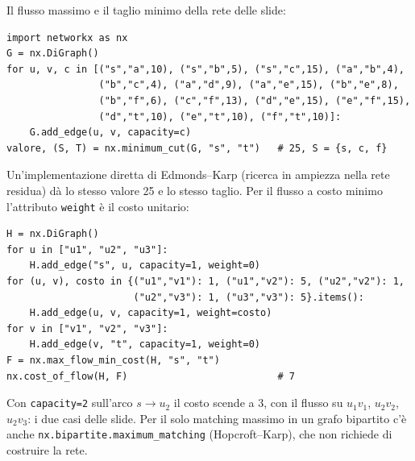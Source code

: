 Il flusso massimo e il taglio minimo della rete delle slide:
\begin{lstlisting}
import networkx as nx
G = nx.DiGraph()
for u, v, c in [("s","a",10), ("s","b",5), ("s","c",15), ("a","b",4),
                ("b","c",4), ("a","d",9), ("a","e",15), ("b","e",8),
                ("b","f",6), ("c","f",13), ("d","e",15), ("e","f",15),
                ("d","t",10), ("e","t",10), ("f","t",10)]:
    G.add_edge(u, v, capacity=c)
valore, (S, T) = nx.minimum_cut(G, "s", "t")   # 25, S = {s, c, f}
\end{lstlisting}
Un'implementazione diretta di Edmonds--Karp (ricerca in ampiezza nella rete residua) dà lo
stesso valore 25 e lo stesso taglio. Per il flusso a costo minimo l'attributo
\texttt{weight} è il costo unitario:
\begin{lstlisting}
H = nx.DiGraph()
for u in ["u1", "u2", "u3"]:
    H.add_edge("s", u, capacity=1, weight=0)
for (u, v), costo in {("u1","v1"): 1, ("u1","v2"): 5, ("u2","v2"): 1,
                      ("u2","v3"): 1, ("u3","v3"): 5}.items():
    H.add_edge(u, v, capacity=1, weight=costo)
for v in ["v1", "v2", "v3"]:
    H.add_edge(v, "t", capacity=1, weight=0)
F = nx.max_flow_min_cost(H, "s", "t")
nx.cost_of_flow(H, F)                          # 7
\end{lstlisting}
Con \texttt{capacity=2} sull'arco $s \to u_2$ il costo scende a 3, con il flusso su
$u_1v_1$, $u_2v_2$, $u_2v_3$: i due casi delle slide. Per il solo matching massimo in un
grafo bipartito c'è anche \texttt{nx.bipartite.maximum\_matching} (Hopcroft--Karp), che
non richiede di costruire la rete.

